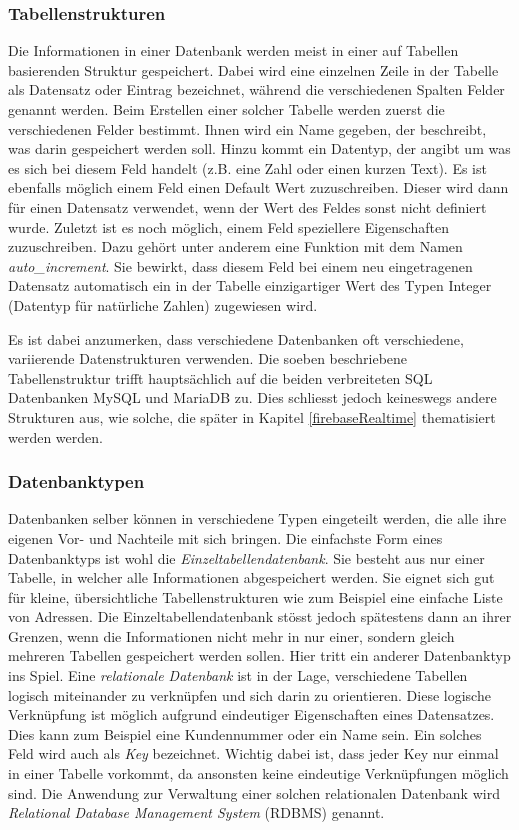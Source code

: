 \documentclass[../main.tex]{subfiles}
\begin{document}
	\subsubsection*{Tabellenstrukturen}
	Die Informationen in einer Datenbank werden meist in einer auf Tabellen basierenden Struktur gespeichert. Dabei wird eine einzelnen Zeile in der Tabelle als Datensatz oder Eintrag bezeichnet, während die verschiedenen Spalten Felder genannt werden. Beim Erstellen einer solcher Tabelle werden zuerst die verschiedenen Felder bestimmt. Ihnen wird ein Name gegeben, der beschreibt, was darin gespeichert werden soll. Hinzu kommt ein Datentyp, der angibt um was es sich bei diesem Feld handelt (z.B. eine Zahl oder einen kurzen Text). Es ist ebenfalls möglich einem Feld einen Default Wert zuzuschreiben. Dieser wird dann für einen Datensatz verwendet, wenn der Wert des Feldes sonst nicht definiert wurde. Zuletzt ist es noch möglich, einem Feld speziellere Eigenschaften zuzuschreiben. Dazu gehört unter anderem eine Funktion mit dem Namen \emph{auto\_increment}. Sie bewirkt, dass diesem Feld bei einem neu eingetragenen Datensatz automatisch ein in der Tabelle einzigartiger Wert des Typen Integer (Datentyp für natürliche Zahlen) zugewiesen wird.
	
	Es ist dabei anzumerken, dass verschiedene Datenbanken oft verschiedene, variierende Datenstrukturen verwenden. Die soeben beschriebene Tabellenstruktur trifft hauptsächlich auf die beiden verbreiteten SQL Datenbanken MySQL und MariaDB zu. Dies schliesst jedoch keineswegs andere Strukturen aus, wie solche, die später in Kapitel \ref{firebaseRealtime} thematisiert werden werden.
	
	\subsubsection*{Datenbanktypen}
	Datenbanken selber können in verschiedene Typen eingeteilt werden, die alle ihre eigenen Vor- und Nachteile mit sich bringen. Die einfachste Form eines Datenbanktyps ist wohl die \emph{Einzeltabellendatenbank}. Sie besteht aus nur einer Tabelle, in welcher alle Informationen abgespeichert werden. Sie eignet sich gut für kleine, übersichtliche Tabellenstrukturen wie zum Beispiel eine einfache Liste von Adressen. Die Einzeltabellendatenbank stösst jedoch spätestens dann an ihrer Grenzen, wenn die Informationen nicht mehr in nur einer, sondern gleich mehreren Tabellen gespeichert werden sollen. Hier tritt ein anderer Datenbanktyp ins Spiel. Eine \emph{relationale Datenbank} ist in der Lage, verschiedene Tabellen logisch miteinander zu verknüpfen und sich darin zu orientieren. Diese logische Verknüpfung ist möglich aufgrund eindeutiger Eigenschaften eines Datensatzes. Dies kann zum Beispiel eine Kundennummer oder ein Name sein. Ein solches Feld wird auch als \emph{Key} bezeichnet. Wichtig dabei ist, dass jeder Key nur einmal in einer Tabelle vorkommt, da ansonsten keine eindeutige Verknüpfungen möglich sind. Die Anwendung zur Verwaltung einer solchen relationalen Datenbank wird \emph{Relational Database Management System} (RDBMS) genannt. \cite[S. 745 - 751]{IT-Handbuch}
	
\end{document}
